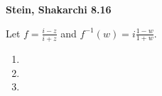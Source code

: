 \textbf{Stein, Shakarchi 8.16}

Let $f = \frac{i - z}{i + z}$ and $f^{-1}(w) = i \frac{1 - w}{1 + w}$.

\begin{enumerate}
  \item 
  \pagebreak
  \item 
  \pagebreak
  \item 
\end{enumerate}